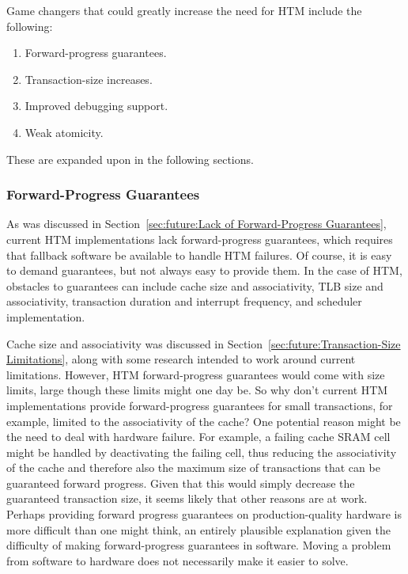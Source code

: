 Game changers that could greatly increase the need for HTM include
the following:

\begin{enumerate}
\item	Forward-progress guarantees.
\item	Transaction-size increases.
\item	Improved debugging support.
\item	Weak atomicity.
\end{enumerate}

These are expanded upon in the following sections.

\subsubsection{Forward-Progress Guarantees}
\label{sec:future:Forward-Progress Guarantees}

As was discussed in
Section~\ref{sec:future:Lack of Forward-Progress Guarantees},
current HTM implementations lack forward-progress guarantees, which requires
that fallback software be available to handle HTM failures.
Of course, it is easy to demand guarantees, but not always easy
to provide them.
In the case of HTM, obstacles to guarantees can include cache size and
associativity, TLB size and associativity, transaction duration and
interrupt frequency, and scheduler implementation.

Cache size and associativity was discussed in
Section~\ref{sec:future:Transaction-Size Limitations},
along with some research intended to work around current limitations.
However, HTM forward-progress guarantees would
come with size limits, large though these limits might one day be.
So why don't current HTM implementations provide forward-progress
guarantees for small transactions, for example, limited to the
associativity of the cache?
One potential reason might be the need to deal with hardware failure.
For example, a failing cache SRAM cell might be handled by deactivating
the failing cell, thus reducing the associativity of the cache and
therefore also the maximum size of transactions that can be guaranteed
forward progress.
Given that this would simply decrease the guaranteed transaction size,
it seems likely that other reasons are at work.
Perhaps providing forward progress guarantees on production-quality
hardware is more difficult than one might think, an entirely plausible
explanation given the difficulty of making forward-progress guarantees
in software.
Moving a problem from software to hardware does not necessarily make
it easier to solve.

